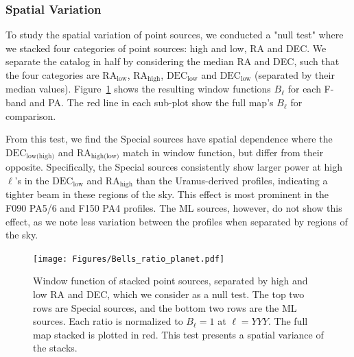 \subsubsection{Spatial Variation}
\label{subsubsec:null_mainbeam}
To study the spatial variation of point sources, we conducted a "null test" where we stacked four categories of point sources: high and low, RA and DEC.  We separate the catalog in half by considering the median RA and DEC, such that the four categories are $\text{RA}_{\text{low}}$, $\text{RA}_{\text{high}}$, $\text{DEC}_{\text{low}}$ and $\text{DEC}_{\text{low}}$ (separated by their median values). 
 Figure~\ref{fig:bells} shows the resulting window functions $B_{\ell}$ for each F-band and PA.  The red line in each sub-plot show the full map's $B_{\ell}$ for comparison.

From this test, we find the Special sources have spatial dependence where the $\text{DEC}_{\text{low(high)}}$ and $\text{RA}_{\text{high(low)}}$ match in window function, but differ from their opposite.  Specifically, the Special sources consistently show larger power at high $\ell$'s in the $\text{DEC}_{\text{low}}$ and $\text{RA}_{\text{high}}$ than the Uranus-derived profiles, indicating a tighter beam in these regions of the sky.  This effect is most prominent in the F090 PA5/6 and F150 PA4 profiles.  The ML sources, however, do not show this effect, as we note less variation between the profiles when separated by regions of the sky.

\begin{figure}
    \centering
    \texttt{[image: Figures/Bells\_ratio\_planet.pdf]}
    \caption{Window function of stacked point sources, separated by high and low RA and DEC, which we consider as a null test.  The top two rows are Special sources, and the bottom two rows are the ML sources.  Each ratio is normalized to $B_\ell =1$ at $\ell=YYY$.  The full map stacked is plotted in red.  This test presents a spatial variance of the stacks.}
    \label{fig:bells}
\end{figure}

